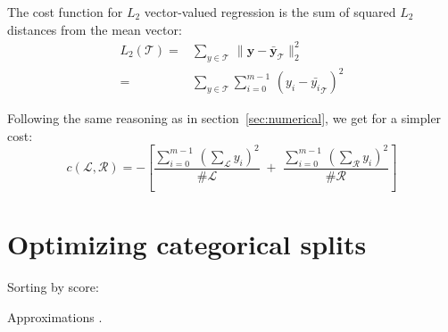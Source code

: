 The cost function for $L_2$ vector-valued regression is the sum of
squared $L_2$ distances from the mean vector: 
\begin{align*}
L_{2}\left(\mathcal{T}\right) 
= &
\sum_{y\in\mathcal{T}}\,
\|\mathbf{y}-\bar{\mathbf{y}}_{\mathcal{T}}\|_{2}^{2}\\
= &
\sum_{y\in\mathcal{T}}\sum_{i=0}^{m-1}\,
\left(y_i-\bar{y_i}_{\mathcal{T}}\right)^{2}
\end{align*}

Following the same reasoning as in section~\ref{sec:numerical}, 
we get for a simpler cost:
$$
c\left(\mathcal{L},\mathcal{R}\right) = 
-\left[
\frac{
\sum_{i=0}^{m-1} \, \left(\sum_{\mathcal{L}}y_i\right)^{2}}
{\#\mathcal{L}}
\; + \;
\frac{\sum_{i=0}^{m-1} \,
\left(\sum_{\mathcal{R}}y_i\right)^{2}}{\#\mathcal{R}}\right] 
$$

\section{Optimizing categorical splits}

Sorting by score: 
\cite{breiman-friedman-olshen-stone-1984}
\cite{fisher-1958}
\cite{ripley-1996}

Approximations \cite{loh-vanichesetakul-1988}.

\newpage{}



